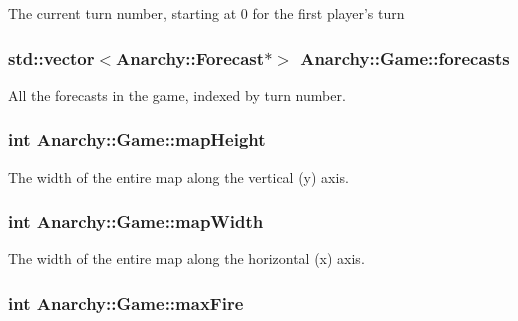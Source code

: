 The current turn number, starting at 0 for the first player's turn 

\hypertarget{classAnarchy_1_1Game_a756081a4d3d50cc285d0fac27eea7c5d}{
\subsubsection[{forecasts}]{\setlength{\rightskip}{0pt plus 5cm}std\-::vector$<${\bf Anarchy\-::\-Forecast}$\ast$$>$ Anarchy\-::\-Game\-::forecasts}}\label{classAnarchy_1_1Game_a756081a4d3d50cc285d0fac27eea7c5d}


All the forecasts in the game, indexed by turn number. 

\hypertarget{classAnarchy_1_1Game_aaa29aba3235be8bcd5103507ce42b423}{
\subsubsection[{map\-Height}]{\setlength{\rightskip}{0pt plus 5cm}int Anarchy\-::\-Game\-::map\-Height}}\label{classAnarchy_1_1Game_aaa29aba3235be8bcd5103507ce42b423}


The width of the entire map along the vertical (y) axis. 

\hypertarget{classAnarchy_1_1Game_a7693a0b5c342b32fda1de11b1b03d541}{
\subsubsection[{map\-Width}]{\setlength{\rightskip}{0pt plus 5cm}int Anarchy\-::\-Game\-::map\-Width}}\label{classAnarchy_1_1Game_a7693a0b5c342b32fda1de11b1b03d541}


The width of the entire map along the horizontal (x) axis. 

\hypertarget{classAnarchy_1_1Game_a306fca75bb8c449f1e17a1ec38c2ab97}{
\subsubsection[{max\-Fire}]{\setlength{\rightskip}{0pt plus 5cm}int Anarchy\-::\-Game\-::max\-Fire}}\label{classAnarchy_1_1Game_a306fca75bb8c449f1e17a1ec38c2ab97}


